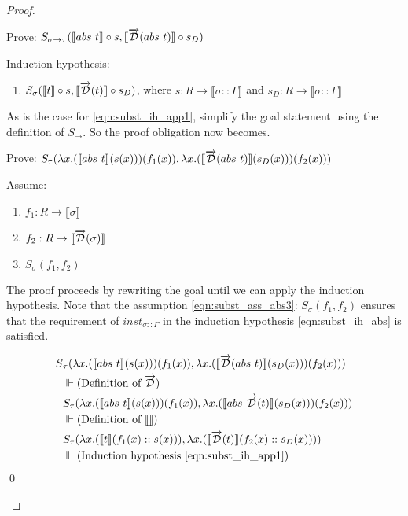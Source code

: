 \documentclass[11pt, final]{article}
\begin{document}
\begin{proof}
\begin{enumerate}
        Prove: $S_{\sigma\rightarrow\tau}(\llbracket abs\ t \rrbracket \circ s, \llbracket \overrightarrow{\mathcal{D}}(abs\ t) \rrbracket \circ s_D)$

        Induction hypothesis:
        \begin{enumerate}
          \item \label{eqn:subst_ih_abs} $S_\sigma(\llbracket t \rrbracket \circ s, \llbracket \overrightarrow{\mathcal{D}}(t) \rrbracket \circ s_D)$, where $s : R \rightarrow \llbracket \sigma::\Gamma \rrbracket$ and $s_D : R \rightarrow \llbracket \sigma::\Gamma \rrbracket$
        \end{enumerate}

        As is the case for \ref{eqn:subst_ih_app1}, simplify the goal statement using the definition of $S_\rightarrow$. So the proof obligation now becomes.

        Prove: $S_{\tau}(\lambda x. (\llbracket abs\ t \rrbracket (s(x)))(f_1(x)), \lambda x. (\llbracket \overrightarrow{\mathcal{D}}(abs\ t) \rrbracket (s_D(x)))(f_2(x)))$

        Assume:
        \begin{enumerate}
          \item $f_1 : R \rightarrow \llbracket \sigma \rrbracket$
          \item $f_2 : R \rightarrow \llbracket \overrightarrow{\mathcal{D}}(\sigma) \rrbracket$
          \item \label{eqn:subst_ass_abs3} $S_\sigma(f_1, f_2)$
        \end{enumerate}

        The proof proceeds by rewriting the goal until we can apply the induction hypothesis.
        Note that the assumption \ref{eqn:subst_ass_abs3}: $S_\sigma(f_1, f_2)$ ensures that the requirement of $inst_{\sigma::\Gamma}$ in the induction hypothesis \ref{eqn:subst_ih_abs} is satisfied.

        \begin{align*}
          S&_{\tau}(\lambda x. (\llbracket abs\ t \rrbracket (s(x)))(f_1(x)), \lambda x. (\llbracket \overrightarrow{\mathcal{D}}(abs\ t) \rrbracket (s_D(x)))(f_2(x))) \\
            &\Vdash \text{(Definition of $\overrightarrow{\mathcal{D}}$)}\\
            & S_{\tau}(\lambda x. (\llbracket abs\ t \rrbracket (s(x)))(f_1(x)), \lambda x. (\llbracket abs\ \overrightarrow{\mathcal{D}}(t) \rrbracket (s_D(x)))(f_2(x))) \\
            &\Vdash \text{(Definition of $\llbracket \rrbracket$)}\\
            & S_{\tau}(\lambda x. (\llbracket t \rrbracket (f_1(x) :: s(x))), \lambda x. (\llbracket \overrightarrow{\mathcal{D}}(t) \rrbracket (f_2(x) :: s_D(x)))) \\
            &\Vdash \text{(Induction hypothesis \ref{eqn:subst_ih_app1})}
        \end{align*} \qed


\end{enumerate}
\end{proof}
\end{document}
